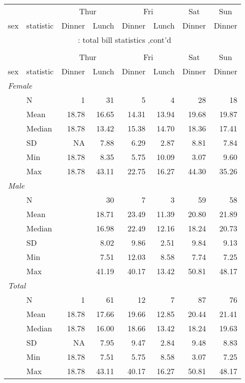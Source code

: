 \documentclass[8pt]{beamer}
\begin{document}
\begin{frame}
\hypertarget{total bill statistics}{} 
\lfoot{\footnotesize }
\footnotesize\begin{longtable}{llrrrrrr}
\toprule
&&
\multicolumn{2}{c}{Thur}&\multicolumn{2}{c}{Fri}&\multicolumn{1}{c}{Sat}&\multicolumn{1}{c}{Sun} \\
\cmidrule(lr){3-4} \cmidrule(lr){5-6} \cmidrule(lr){7-7} \cmidrule(lr){8-8}
sex & statistic & Dinner & Lunch & Dinner & Lunch & Dinner & Dinner \\
\hline
\endfirsthead
\multicolumn{8}{c}{\tablename~\thetable{}: total bill statistics ,cont'd}\\\\
\toprule
&&
\multicolumn{2}{c}{Thur}&\multicolumn{2}{c}{Fri}&\multicolumn{1}{c}{Sat}&\multicolumn{1}{c}{Sun} \\
\cmidrule(lr){3-4} \cmidrule(lr){5-6} \cmidrule(lr){7-7} \cmidrule(lr){8-8}
sex & statistic & Dinner & Lunch & Dinner & Lunch & Dinner & Dinner \\
\hline
\endhead
\multicolumn{ 7 }{l}{\textit{ Female }}\\
& N & 1 & 31 & 5 & 4 & 28 & 18 \\
 & Mean & 18.78 & 16.65 & 14.31 & 13.94 & 19.68 & 19.87 \\
 & Median & 18.78 & 13.42 & 15.38 & 14.70 & 18.36 & 17.41 \\
 & SD &  NA & 7.88 & 6.29 & 2.87 & 8.81 & 7.84 \\
 & Min & 18.78 & 8.35 & 5.75 & 10.09 & 3.07 & 9.60 \\
 & Max & 18.78 & 43.11 & 22.75 & 16.27 & 44.30 & 35.26 \\
\multicolumn{ 7 }{l}{\textit{ Male }}\\
& N &  & 30 & 7 & 3 & 59 & 58 \\
 & Mean &  & 18.71 & 23.49 & 11.39 & 20.80 & 21.89 \\
 & Median &  & 16.98 & 22.49 & 12.16 & 18.24 & 20.73 \\
 & SD &  & 8.02 & 9.86 & 2.51 & 9.84 & 9.13 \\
 & Min &  & 7.51 & 12.03 & 8.58 & 7.74 & 7.25 \\
 & Max &  & 41.19 & 40.17 & 13.42 & 50.81 & 48.17 \\
\multicolumn{ 7 }{l}{\textit{ Total }}\\
& N & 1 & 61 & 12 & 7 & 87 & 76 \\
 & Mean & 18.78 & 17.66 & 19.66 & 12.85 & 20.44 & 21.41 \\
 & Median & 18.78 & 16.00 & 18.66 & 13.42 & 18.24 & 19.63 \\
 & SD &  NA & 7.95 & 9.47 & 2.84 & 9.48 & 8.83 \\
 & Min & 18.78 & 7.51 & 5.75 & 8.58 & 3.07 & 7.25 \\
 & Max & 18.78 & 43.11 & 40.17 & 16.27 & 50.81 & 48.17 \\
\bottomrule\end{longtable}
\end{frame}
\end{document}

